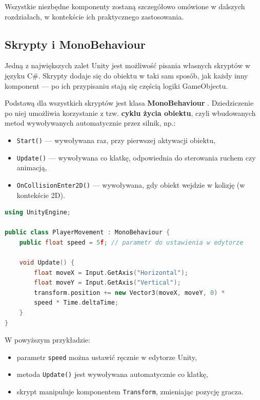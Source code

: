 \documentclass[a4paper,12pt]{book} %
\begin{document}
Wszystkie niezbędne komponenty zostaną szczegółowo omówione w dalszych rozdziałach, w kontekście ich praktycznego zastosowania.  

\subsection{Skrypty i MonoBehaviour}

Jedną z największych zalet Unity jest możliwość pisania własnych skryptów w języku C\#.  
Skrypty dodaje się do obiektu w taki sam sposób, jak każdy inny komponent --- 
po ich przypisaniu stają się częścią logiki GameObjectu.  

Podstawą dla wszystkich skryptów jest klasa \textbf{MonoBehaviour} \cite{MonoBehaviour}. 
Dziedziczenie po niej umożliwia korzystanie z tzw. \textbf{cyklu życia obiektu}, 
czyli wbudowanych metod wywoływanych automatycznie przez silnik, np.:
\begin{itemize}
  \item \texttt{Start()} — wywoływana raz, przy pierwszej aktywacji obiektu,
  \item \texttt{Update()} — wywoływana co klatkę, odpowiednia do sterowania ruchem czy animacją,
  \item \texttt{OnCollisionEnter2D()} — wywoływana, gdy obiekt wejdzie w kolizję (w kontekście 2D).
\end{itemize}

\begin{lstlisting}[language=C++, caption={Przykład prostego skryptu ruchu w Unity (C\#)}, label={lst:unity_move}]
using UnityEngine;

public class PlayerMovement : MonoBehaviour {
    public float speed = 5f; // parametr do ustawienia w edytorze

    void Update() {
        float moveX = Input.GetAxis("Horizontal");
        float moveY = Input.GetAxis("Vertical");
        transform.position += new Vector3(moveX, moveY, 0) *
        speed * Time.deltaTime;
    }
}
\end{lstlisting}

W powyższym przykładzie:
\begin{itemize}
  \item parametr \texttt{speed} można ustawić ręcznie w edytorze Unity,
  \item metoda \texttt{Update()} jest wywoływana automatycznie co klatkę,
  \item skrypt manipuluje komponentem \texttt{Transform}, zmieniając pozycję gracza.  
\end{itemize}
\end{document}
